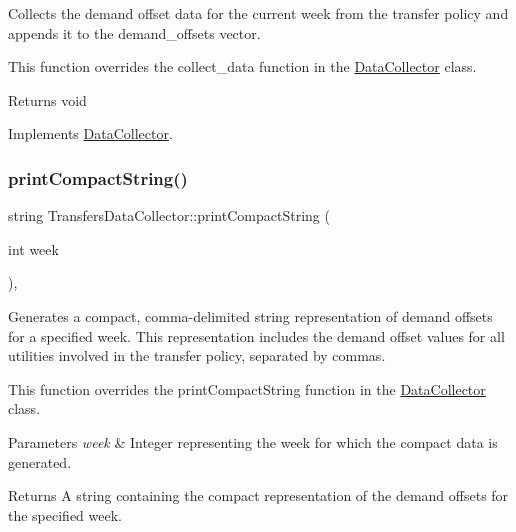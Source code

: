 Collects the demand offset data for the current week from the transfer policy and appends it to the {\ttfamily demand\+\_\+offsets} vector. 

This function overrides the {\ttfamily collect\+\_\+data} function in the {\ttfamily \mbox{\hyperlink{classDataCollector}{Data\+Collector}}} class.

\begin{DoxyReturn}{Returns}
void 
\end{DoxyReturn}


Implements \mbox{\hyperlink{classDataCollector_a01486bf58acbe37b203f97b3b9a79c40}{Data\+Collector}}.

\mbox{\label{classTransfersDataCollector_aa5385877143c67a4d300032160239cfe}} 
\subsubsection{\texorpdfstring{print\+Compact\+String()}{printCompactString()}}
{\footnotesize\ttfamily string Transfers\+Data\+Collector\+::print\+Compact\+String (\begin{DoxyParamCaption}\item[{int}]{week }\end{DoxyParamCaption})\hspace{0.3cm}{\ttfamily [override]}, {\ttfamily [virtual]}}



Generates a compact, comma-\/delimited string representation of demand offsets for a specified week. This representation includes the demand offset values for all utilities involved in the transfer policy, separated by commas. 

This function overrides the {\ttfamily print\+Compact\+String} function in the {\ttfamily \mbox{\hyperlink{classDataCollector}{Data\+Collector}}} class.


\begin{DoxyParams}{Parameters}
{\em week} & Integer representing the week for which the compact data is generated.\\
\hline
\end{DoxyParams}
\begin{DoxyReturn}{Returns}
A string containing the compact representation of the demand offsets for the specified week. 
\end{DoxyReturn}


